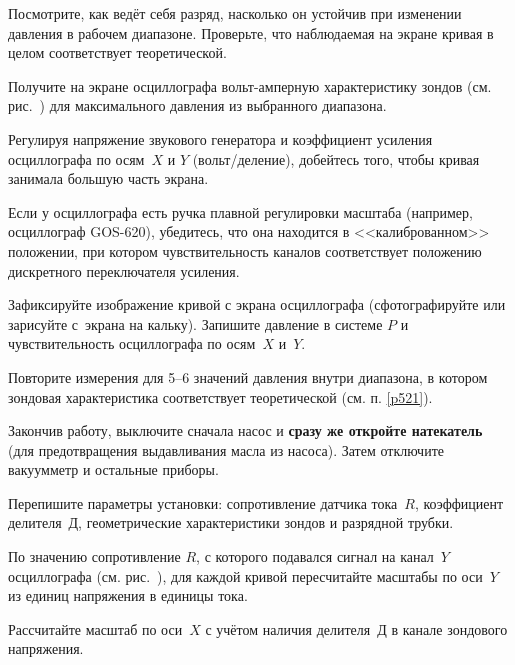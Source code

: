 \begin{lab:task}
\item \label{p521} Посмотрите, как ведёт себя разряд, насколько он устойчив при изменении
давления в рабочем диапазоне. Проверьте, что наблюдаемая 
на экране кривая в целом соответствует теоретической.


\item Получите на экране осциллографа вольт-амперную характеристику зондов
(см. рис.~) для максимального давления из
выбранного диапазона.

\item Регулируя напряжение звукового генератора и коэффициент усиления 
осциллографа по осям~$X$ и $Y$ (вольт/деление), 
добейтесь того, чтобы кривая занимала большую часть экрана. 

Если у осциллографа есть ручка плавной регулировки масштаба
(например, осциллограф GOS-620), убедитесь, что она находится в 
<<калиброванном>> положении, при котором чувствительность каналов 
соответствует положению дискретного переключателя усиления.

\item Зафиксируйте изображение кривой с экрана осциллографа 
(сфотографируйте или зарисуйте с~экрана на кальку). 
Запишите давление в системе $P$ и чувствительность осциллографа по 
осям~$X$ и~$Y$.

\item Повторите измерения для 5--6 значений давления внутри диапазона, 
в котором зондовая характеристика соответствует теоретической
(см. п. \ref{p521}).

\item Закончив работу, выключите сначала насос и \textbf{сразу же откройте натекатель}
(для предотвращения выдавливания масла из насоса).
Затем отключите вакуумметр и остальные приборы.

\item Перепишите параметры установки: сопротивление датчика тока~$R$, коэффициент
делителя~Д, геометрические характеристики зондов и разрядной трубки.


\item По значению сопротивление $R$, с которого подавался
сигнал на канал~$Y$ осциллографа  (см. рис.~), 
для каждой кривой пересчитайте масштабы по оси~$Y$ из единиц
напряжения в единицы тока.
 
Рассчитайте масштаб по оси~$X$ с учётом наличия делителя~Д в канале 
зондового напряжения.


\end{lab:task}

